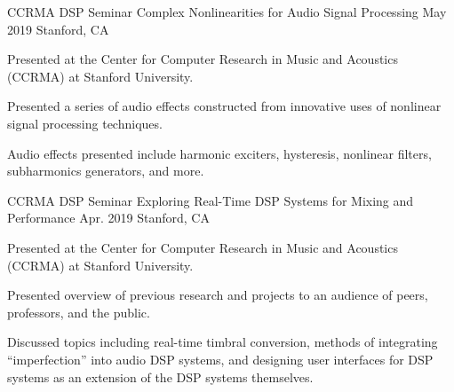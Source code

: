 \begin{cventries}
  \cventry
    {CCRMA DSP Seminar} %
    {Complex Nonlinearities for Audio Signal Processing} %
    {May 2019} %
    {Stanford, CA} %
    {
      \begin{cvitems} %
        \item {Presented at the Center for Computer Research in Music and Acoustics (CCRMA) at Stanford University.}
        \item {Presented a series of audio effects constructed from
               innovative uses of nonlinear signal processing techniques.}
        \item {Audio effects presented include harmonic exciters, hysteresis,
               nonlinear filters, subharmonics generators, and more.}
      \end{cvitems}
    }

    \cventry
    {CCRMA DSP Seminar} %
    {Exploring Real-Time DSP Systems for Mixing and Performance} %
    {Apr. 2019} %
    {Stanford, CA} %
    {
      \begin{cvitems} %
        \item {Presented at the Center for Computer Research in Music and Acoustics (CCRMA) at Stanford University.}
        \item {Presented overview of previous research and projects to an audience of peers, professors, and the public.}
        \item {Discussed topics including real-time timbral conversion, methods of integrating ``imperfection'' into audio
               DSP systems, and designing user interfaces for DSP systems as an extension of the DSP systems themselves.}
      \end{cvitems}
    }


\end{cventries}
